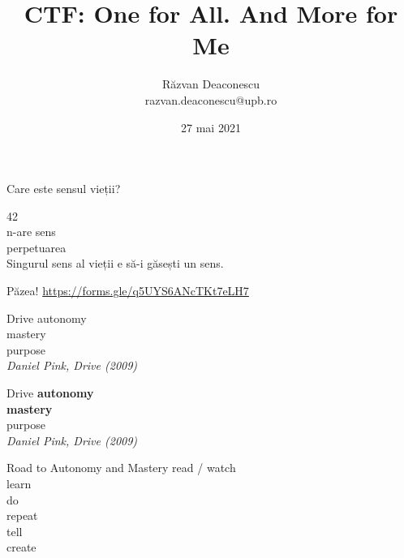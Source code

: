 \documentclass{simple}
\title[CTF]{CTF: One for All. And More for Me}
\institute{UBB Avengers + UPB Justice League = $<$3}
\author[Răzvan Deaconescu]{Răzvan Deaconescu \\
razvan.deaconescu@upb.ro}
\date{27 mai 2021}
\begin{document}
\frame{\titlepage}

\begin{frame}{}
  \centering
  \LARGE
  Care este sensul vieții?
\end{frame}

\begin{frame}{}
  \centering
  \LARGE
  42 \\
  \LARGE
  n-are sens \\
  \LARGE
  perpetuarea \\
  \LARGE
  Singurul sens al vieții e să-i găsești un sens.
\end{frame}

\begin{frame}{Păzea!}
  \centering
  \url{https://forms.gle/q5UYS6ANcTKt7eLH7}
\end{frame}

\begin{frame}{Drive}
  \centering
  \pause
  \vspace{0.5cm}
  \Large{autonomy} \\
  \pause
  \vspace{0.5cm}
  \Large{mastery} \\
  \pause
  \vspace{0.5cm}
  \Large{purpose} \\
  \pause
  \vspace{0.5cm}
  \hfill \textit{Daniel Pink, Drive (2009)}
\end{frame}

\begin{frame}{Drive}
  \centering
  \vspace{0.5cm}
  \Large{\textbf{autonomy}} \\
  \vspace{0.5cm}
  \Large{\textbf{mastery}} \\
  \vspace{0.5cm}
  \Large{purpose} \\
  \vspace{0.5cm}
  \hfill \textit{Daniel Pink, Drive (2009)}
\end{frame}

\begin{frame}{Road to Autonomy and Mastery}
  \centering
  \pause
  \vspace{0.5cm}
  \Large{read / watch} \\
  \pause
  \vspace{0.5cm}
  \Large{learn} \\
  \pause
  \vspace{0.5cm}
  \Large{do} \\
  \pause
  \vspace{0.5cm}
  \Large{repeat} \\
  \pause
  \vspace{0.5cm}
  \Large{tell} \\
  \pause
  \vspace{0.5cm}
  \Large{create}
\end{frame}
\end{document}
